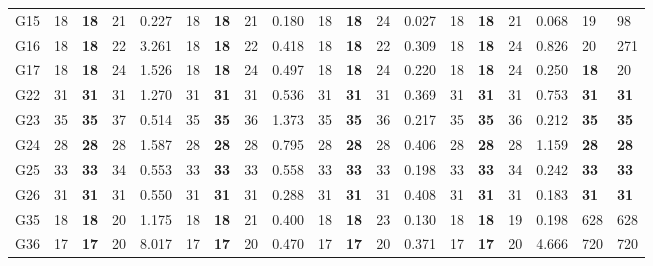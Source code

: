 \documentclass[12pt, a4paper]{article}%
\numberwithin{equation}{section}
\theoremstyle{plain}
\begin{document}
{\begin{landscape}
\begin{longtable}{lllllllllllllllllll}
						G15                       & 18   & \textbf{18}  & 21  & 0.227   & 18      & \textbf{18}  & 21    & 0.180   & 18   & \textbf{18}  & 24  & 0.027   & 18     & \textbf{18}  & 21    & 0.068   & 19                      & 98                   \\
						G16                       & 18   & \textbf{18}  & 22  & 3.261   & 18      & \textbf{18}  & 22    & 0.418   & 18   & \textbf{18}  & 22  & 0.309   & 18     & \textbf{18}  & 24    & 0.826   & 20                      & 271                  \\
						G17                       & 18   & \textbf{18}  & 24  & 1.526   & 18      & \textbf{18}  & 24    & 0.497   & 18   & \textbf{18}  & 24  & 0.220   & 18     & \textbf{18}  & 24    & 0.250   & \textbf{18}             & 20                   \\
						G22                       & 31   & \textbf{31}  & 31  & 1.270   & 31      & \textbf{31}  & 31    & 0.536   & 31   & \textbf{31}  & 31  & 0.369   & 31     & \textbf{31}  & 31    & 0.753   & \textbf{31}             & \textbf{31}          \\
						G23                       & 35   & \textbf{35}  & 37  & 0.514   & 35      & \textbf{35}  & 36    & 1.373   & 35   & \textbf{35}  & 36  & 0.217   & 35     & \textbf{35}  & 36    & 0.212   & \textbf{35}             & \textbf{35}          \\
						G24                       & 28   & \textbf{28}  & 28  & 1.587   & 28      & \textbf{28}  & 28    & 0.795   & 28   & \textbf{28}  & 28  & 0.406   & 28     & \textbf{28}  & 28    & 1.159   & \textbf{28}             & \textbf{28}          \\
						G25                       & 33   & \textbf{33}  & 34  & 0.553   & 33      & \textbf{33}  & 33    & 0.558   & 33   & \textbf{33}  & 33  & 0.198   & 33     & \textbf{33}  & 34    & 0.242   & \textbf{33}             & \textbf{33}          \\
						G26                       & 31   & \textbf{31}  & 31  & 0.550   & 31      & \textbf{31}  & 31    & 0.288   & 31   & \textbf{31}  & 31  & 0.408   & 31     & \textbf{31}  & 31    & 0.183   & \textbf{31}             & \textbf{31}          \\
						G35                       & 18   & \textbf{18}  & 20  & 1.175   & 18      & \textbf{18}  & 21    & 0.400   & 18   & \textbf{18}  & 23  & 0.130   & 18     & \textbf{18}  & 19    & 0.198   & 628                     & 628                  \\
						G36                       & 17   & \textbf{17}  & 20  & 8.017   & 17      & \textbf{17}  & 20    & 0.470   & 17   & \textbf{17}  & 20  & 0.371   & 17     & \textbf{17}  & 20    & 4.666   & 720                     & 720                  \\

\end{longtable}
\end{landscape}}
\end{document}
